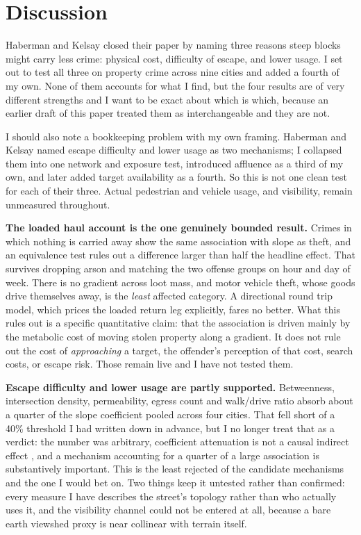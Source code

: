 \documentclass[11pt,letterpaper]{article}
\begin{document}
\section{Discussion}

Haberman and Kelsay closed their paper by naming three reasons steep blocks might
carry less crime: physical cost, difficulty of escape, and lower usage. I set out to
test all three on property crime across nine cities and added a fourth of my own.
None of them accounts for what I find, but the four results are of very different
strengths and I want to be exact about which is which, because an earlier draft of
this paper treated them as interchangeable and they are not.

I should also note a bookkeeping problem with my own framing. Haberman and Kelsay
named escape difficulty and lower usage as two mechanisms; I collapsed them into one
network and exposure test, introduced affluence as a third of my own, and later added
target availability as a fourth. So this is not one clean test for each of their
three. Actual pedestrian and vehicle usage, and visibility, remain unmeasured
throughout.

\textbf{The loaded haul account is the one genuinely bounded result.} Crimes in which
nothing is carried away show the same association with slope as theft, and an
equivalence test rules out a difference larger than half the headline effect. That
survives dropping arson and matching the two offense groups on hour and day of week.
There is no gradient across loot mass, and motor vehicle theft, whose goods drive
themselves away, is the \emph{least} affected category. A directional round trip
model, which prices the loaded return leg explicitly, fares no better. What this
rules out is a specific quantitative claim: that the association is driven mainly by
the metabolic cost of moving stolen property along a gradient. It does not rule out
the cost of \emph{approaching} a target, the offender's perception of that cost,
search costs, or escape risk. Those remain live and I have not tested them.

\textbf{Escape difficulty and lower usage are partly supported.} Betweenness,
intersection density, permeability, egress count and walk/drive ratio absorb about a
quarter of the slope coefficient pooled across four cities. That fell short of a 40\%
threshold I had written down in advance, but I no longer treat that as a verdict: the
number was arbitrary, coefficient attenuation is not a causal indirect effect
\cite{imai2010}, and a mechanism accounting for a quarter of a large association is
substantively important. This is the least rejected of the candidate mechanisms and
the one I would bet on. Two things keep it untested rather than confirmed: every
measure I have describes the street's topology rather than who actually uses it, and
the visibility channel could not be entered at all, because a bare earth viewshed
proxy is near collinear with terrain itself.
\end{document}
